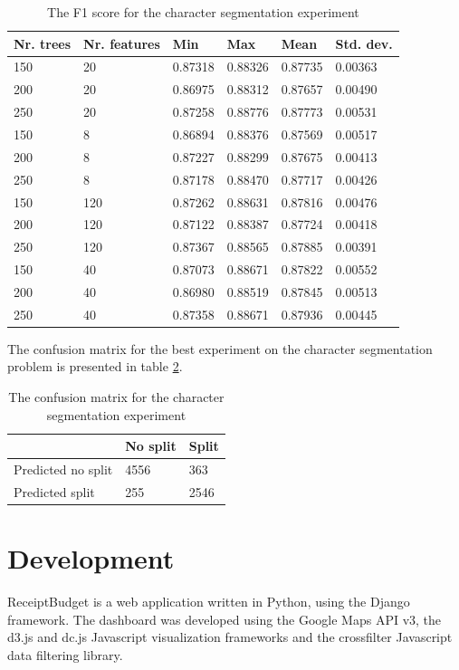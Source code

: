 \begin{table}[h]
\caption{The F1 score for the character segmentation experiment}
\label{table:seg_values}
\begin{tabular}{llllll}
\hline
Nr. trees & Nr. features & Min     & Max     & Mean    & Std. dev. \\ \hline
150 & 20 & 0.87318 & 0.88326 & 0.87735 & 0.00363 \\ 
200 & 20 & 0.86975 & 0.88312 & 0.87657 & 0.00490 \\ 
250 & 20 & 0.87258 & 0.88776 & 0.87773 & 0.00531 \\ 
150 & 8 & 0.86894 & 0.88376 & 0.87569 & 0.00517 \\ 
200 & 8 & 0.87227 & 0.88299 & 0.87675 & 0.00413 \\ 
250 & 8 & 0.87178 & 0.88470 & 0.87717 & 0.00426 \\ 
150 & 120 & 0.87262 & 0.88631 & 0.87816 & 0.00476 \\ 
200 & 120 & 0.87122 & 0.88387 & 0.87724 & 0.00418 \\ 
250 & 120 & 0.87367 & 0.88565 & 0.87885 & 0.00391 \\ 
150 & 40 & 0.87073 & 0.88671 & 0.87822 & 0.00552 \\ 
200 & 40 & 0.86980 & 0.88519 & 0.87845 & 0.00513 \\ 
250 & 40 & 0.87358 & 0.88671 & 0.87936 & 0.00445 \\  \hline
\end{tabular}
\end{table}

The confusion matrix for the best experiment on the character segmentation problem is presented in table \ref{table:seg_conf}.

\begin{table}[h]
\caption{The confusion matrix for the character segmentation experiment}
\label{table:seg_conf}
\begin{tabular}{lll}
\hline
 & No split & Split \\ \hline
Predicted no split & 4556 & 363 \\ 
Predicted split & 255 & 2546 \\  \hline
\end{tabular}
\end{table}
\section{Development}

ReceiptBudget is a web application written in Python, using the Django framework. The dashboard was developed using the Google Maps API v3, the d3.js and dc.js Javascript visualization frameworks and the crossfilter Javascript data filtering library. 

